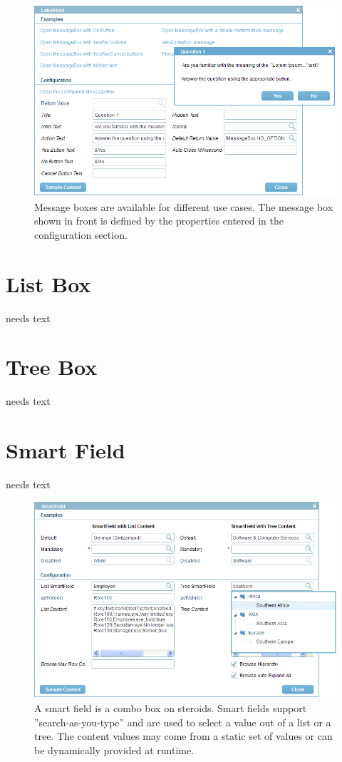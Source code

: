 \documentclass[a4paper,10pt,twoside]{book}
\begin{document}
\begin{figure}
\includegraphics[width=14cm]{messagebox.png}
\caption{Message boxes are available for different use cases.
The message box shown in front is defined by the properties entered in the configuration section.}
\end{figure}


\section{List Box}
needs text

\section{Tree Box}
needs text

\section{Smart Field}
needs text

\begin{figure}
\includegraphics[width=14cm]{smartfield.png}
\caption{A smart field is a combo box on steroids.
Smart fields support ''search-as-you-type'' and are used to select a value out of a list or a tree.
The content values may come from a static set of values or can be dynamically provided at runtime.}
\end{figure}
\end{document}
